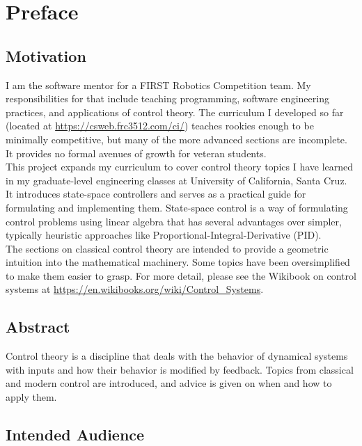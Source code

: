 \setcounter{secnumdepth}{-1}

\section{Preface}

\subsection{Motivation}

I am the software mentor for a FIRST Robotics Competition team. My
responsibilities for that include teaching programming, software engineering
practices, and applications of control theory. The curriculum I developed so far
(located at \url{https://csweb.frc3512.com/ci/}) teaches rookies enough to be
minimally competitive, but many of the more advanced sections are incomplete. It
provides no formal avenues of growth for veteran students. \\

This project expands my curriculum to cover control theory topics I have learned
in my graduate-level engineering classes at University of California,
Santa Cruz. It introduces state-space controllers and serves as a practical
guide for formulating and implementing them. State-space control is a way of
formulating control problems using linear algebra that has several advantages
over simpler, typically heuristic approaches like
Proportional-Integral-Derivative (PID). \\

The sections on classical control theory are intended to provide a geometric
intuition into the mathematical machinery. Some topics have been oversimplified
to make them easier to grasp. For more detail, please see the Wikibook on
control systems at \url{https://en.wikibooks.org/wiki/Control_Systems}.

\subsection{Abstract}

Control theory is a discipline that deals with the behavior of dynamical
\glspl{system} with inputs and how their behavior is modified by feedback.
Topics from classical and modern control are introduced, and advice is given on
when and how to apply them.

\subsection{Intended Audience}


